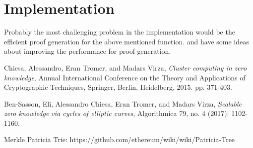 \documentclass{article}
\begin{document}
\section{Implementation}

Probably the most challenging problem in the implementation would be the efficient proof generation for the above mentioned function. \cite{zkCluster} and \cite{scalableZKSNARK} have some ideas about improving the performance for proof generation.

\begin{thebibliography}{9}
	
	Chiesa, Alessandro, Eran Tromer, and Madars Virza,
	\textit{Cluster computing in zero knowledge},
	Annual International Conference on the Theory and Applications of Cryptographic Techniques, Springer, Berlin, Heidelberg, 2015. pp. 371-403.
	
	Ben-Sasson, Eli, Alessandro Chiesa, Eran Tromer, and Madars Virza,
	\textit{Scalable zero knowledge via cycles of elliptic curves}, Algorithmica 79, no. 4 (2017): 1102-1160.
	
	Merkle Patricia Trie: https://github.com/ethereum/wiki/wiki/Patricia-Tree
	
	
	
	
\end{thebibliography}
		
\end{document}

